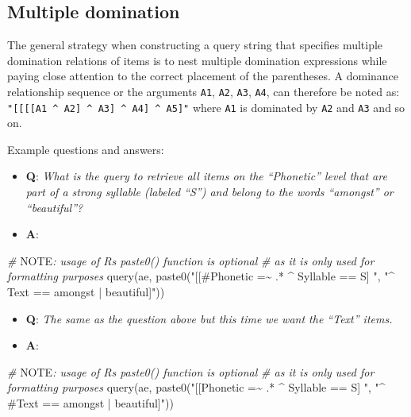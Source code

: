 \documentclass[
]{book}
\newenvironment{Shaded}{\begin{snugshade}}{\end{snugshade}}
\newcommand{\AlertTok}[1]{\textcolor[rgb]{0.94,0.16,0.16}{#1}}
\newcommand{\CommentTok}[1]{\textcolor[rgb]{0.56,0.35,0.01}{\textit{#1}}}
\newcommand{\FunctionTok}[1]{\textcolor[rgb]{0.00,0.00,0.00}{#1}}
\newcommand{\NormalTok}[1]{#1}
\newcommand{\StringTok}[1]{\textcolor[rgb]{0.31,0.60,0.02}{#1}}
\providecommand{\tightlist}{%
  \setlength{\itemsep}{0pt}\setlength{\parskip}{0pt}}
\begin{document}
\hypertarget{multiple-domination}{%
\subsection{Multiple domination}\label{multiple-domination}}

The general strategy when constructing a query string that specifies multiple domination relations of items is to nest multiple domination expressions while paying close attention to the correct placement of the parentheses. A dominance relationship sequence or the arguments \texttt{A1}, \texttt{A2}, \texttt{A3}, \texttt{A4}, can therefore be noted as: \texttt{"{[}{[}{[}{[}A1\ \^{}\ A2{]}\ \^{}\ A3{]}\ \^{}\ A4{]}\ \^{}\ A5{]}"} where \texttt{A1} is dominated by \texttt{A2} and \texttt{A3} and so on.

Example questions and answers:

\begin{itemize}
\tightlist
\item
  \textbf{Q}: \emph{What is the query to retrieve all items on the ``Phonetic'' level that are part of a strong syllable (labeled ``S'') and belong to the words ``amongst'' or ``beautiful''?}
\item
  \textbf{A}:
\end{itemize}

\begin{Shaded}
\begin{Highlighting}[]
\CommentTok{\# }\AlertTok{NOTE}\CommentTok{: usage of R\textquotesingle{}s paste0() function is optional}
\CommentTok{\# as it is only used for formatting purposes}
\FunctionTok{query}\NormalTok{(ae, }\FunctionTok{paste0}\NormalTok{(}\StringTok{"[[\#Phonetic =\textasciitilde{} .* \^{} Syllable == S] "}\NormalTok{,}
                 \StringTok{"\^{} Text == amongst | beautiful]"}\NormalTok{))}
\end{Highlighting}
\end{Shaded}

\begin{itemize}
\tightlist
\item
  \textbf{Q}: \emph{The same as the question above but this time we want the ``Text'' items.}
\item
  \textbf{A}:
\end{itemize}

\begin{Shaded}
\begin{Highlighting}[]
\CommentTok{\# }\AlertTok{NOTE}\CommentTok{: usage of R\textquotesingle{}s paste0() function is optional}
\CommentTok{\# as it is only used for formatting purposes}
\FunctionTok{query}\NormalTok{(ae, }\FunctionTok{paste0}\NormalTok{(}\StringTok{"[[Phonetic =\textasciitilde{} .* \^{} Syllable == S] "}\NormalTok{,}
                 \StringTok{"\^{} \#Text == amongst | beautiful]"}\NormalTok{))}
\end{Highlighting}
\end{Shaded}
\end{document}
